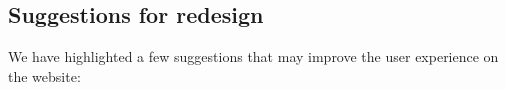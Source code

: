 
\subsection{Suggestions for redesign}

We have highlighted a few suggestions that may improve the user experience on the website:

